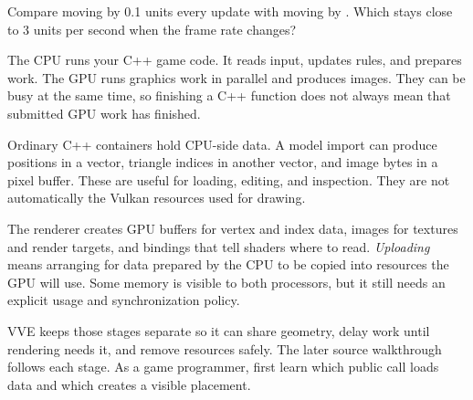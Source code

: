 \documentclass[11pt,a4paper]{article}
\begin{document}
\begin{tryit}Compare moving by 0.1 units every update with moving by . Which stays close to 3 units per second when the frame rate changes?\end{tryit}

The CPU runs your C++ game code. It reads input, updates rules, and prepares work. The GPU runs graphics work in parallel and produces images. They can be busy at the same time, so finishing a C++ function does not always mean that submitted GPU work has finished.

Ordinary C++ containers hold CPU-side data. A model import can produce positions in a vector, triangle indices in another vector, and image bytes in a pixel buffer. These are useful for loading, editing, and inspection. They are not automatically the Vulkan resources used for drawing.

The renderer creates GPU buffers for vertex and index data, images for textures and render targets, and bindings that tell shaders where to read. \emph{Uploading} means arranging for data prepared by the CPU to be copied into resources the GPU will use. Some memory is visible to both processors, but it still needs an explicit usage and synchronization policy.

\begin{center}
\end{center}

VVE keeps those stages separate so it can share geometry, delay work until rendering needs it, and remove resources safely. The later source walkthrough follows each stage. As a game programmer, first learn which public call loads data and which creates a visible placement.
\end{document}
